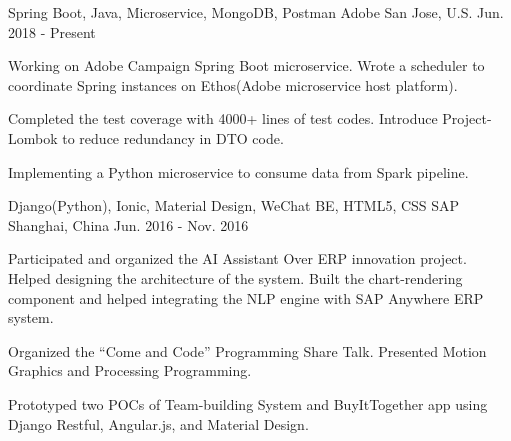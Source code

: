 


\begin{cventries}


\cventry
{Spring Boot, Java, Microservice, MongoDB, Postman} %
{Adobe} %
{San Jose, U.S.} %
{Jun. 2018 - Present} %
{ %
\begin{cvitems}
\item {Working on Adobe Campaign Spring Boot microservice. Wrote a scheduler to coordinate Spring instances on Ethos(Adobe microservice host platform).}
\item {Completed the test coverage with 4000+ lines of test codes. Introduce Project-Lombok to reduce redundancy in DTO code.}
\item {Implementing a Python microservice to consume data from Spark pipeline.}
\end{cvitems}
}


\cventry
{Django(Python), Ionic, Material Design, WeChat BE, HTML5, CSS} %
{SAP} %
{Shanghai, China} %
{Jun. 2016 - Nov. 2016} %
{ %
\begin{cvitems}
\item {Participated and organized the AI Assistant Over ERP innovation project. Helped designing the architecture of the system. Built the chart-rendering component and helped integrating the NLP engine with SAP Anywhere ERP system.}
\item {Organized the “Come and Code” Programming Share Talk. Presented Motion Graphics and Processing Programming.}
\item {Prototyped two POCs of Team-building System and BuyItTogether app using Django Restful, Angular.js, and Material Design.}
\end{cvitems}
}


\end{cventries}
